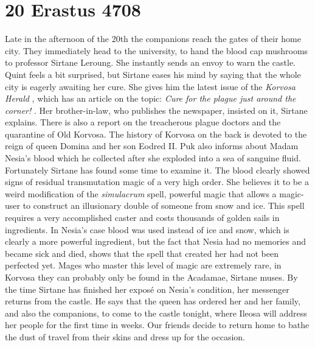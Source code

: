 \section{20 Erastus 4708}

Late in the afternoon of the 20th the companions reach the gates of their home city. They immediately head to the university, to hand the blood cap mushrooms to professor Sirtane Leroung. She instantly sends an envoy to warn the castle. Quint feels a bit surprised, but Sirtane eases his mind by saying that the whole city is eagerly awaiting her cure. She gives him the latest issue of the {\itshape Korvosa Herald} , which has an article on the topic:  {\itshape Cure for the plague just around the corner!} . Her brother-in-law, who publishes the newspaper, insisted on it, Sirtane explains. There is also a report on the treacherous plague doctors and the quarantine of Old Korvosa. The history of Korvosa on the back is devoted to the reign of queen Domina and her son Eodred II. Puk also informs about Madam Nesia's blood which he collected after she exploded into a sea of sanguine fluid. Fortunately Sirtane has found some time to examine it. The blood clearly showed signs of residual transmutation magic of a very high order. She believes it to be a weird modification of the {\itshape simulacrum} spell, powerful magic that allows a magic-user to construct an illusionary double of someone from snow and ice. This spell requires a very accomplished caster and costs thousands of golden sails in ingredients. In Nesia's case blood was used instead of ice and snow, which is clearly a more powerful ingredient, but the fact that Nesia had no memories and became sick and died, shows that the spell that created her had not been perfected yet. Mages who master this level of magic are extremely rare, in Korvosa they can probably only be found in the Acadamae, Sirtane muses. By the time Sirtane has finished her expos\'e on Nesia's condition, her messenger returns from the castle. He says that the queen has ordered her and her family, and also the companions, to come to the castle tonight, where Ileosa will address her people for the first time in weeks. Our friends decide to return home to bathe the dust of travel from their skins and dress up for the occasion.\\

